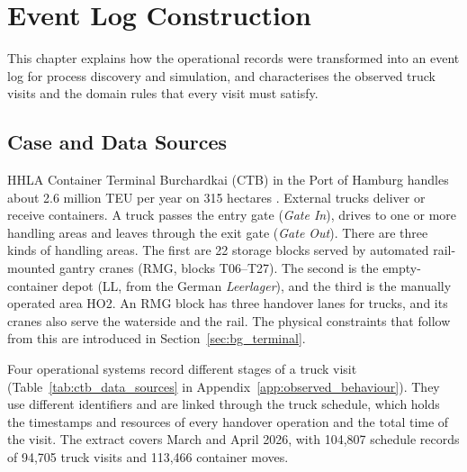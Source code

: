 \chapter{Event Log Construction}
\label{chp:case_study_and_data}

This chapter explains how the operational records were transformed into an event
log for process discovery and simulation, and characterises the observed truck
visits and the domain rules that every visit must satisfy.

\section{Case and Data Sources}
\label{sec:cs_environment}

HHLA Container Terminal Burchardkai (CTB) in the Port of Hamburg handles about
2.6 million TEU per year on 315 hectares \cite{hhla2025}. External trucks deliver
or receive containers. A truck passes the entry gate (\emph{Gate In}), drives to
one or more handling areas and leaves through the exit gate (\emph{Gate Out}).
There are three kinds of handling areas. The first are 22 storage blocks served
by automated rail-mounted gantry cranes (RMG, blocks T06--T27). The second is the
empty-container depot (LL, from the German \emph{Leerlager}), and the third is the
manually operated area HO2. An RMG block has three handover lanes for trucks, and
its cranes also serve the waterside and the rail. The physical constraints that
follow from this are introduced in Section~\ref{sec:bg_terminal}.

\label{sec:cs_data_sources}
Four operational systems record different stages of a truck visit
(Table~\ref{tab:ctb_data_sources} in Appendix~\ref{app:observed_behaviour}).
They use different identifiers and are linked through the truck schedule, which
holds the timestamps and resources of every handover operation and the total time
of the visit. The extract covers March and April 2026, with 104,807 schedule
records of 94,705 truck visits and 113,466 container moves.

